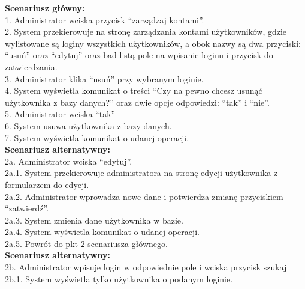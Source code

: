 \textbf{Scenariusz główny:}\\
1. Administrator wciska przycisk “zarządzaj kontami”.\\
2. System przekierowuje na stronę zarządzania kontami użytkowników, gdzie
wylistowane są loginy wszystkich użytkowników, a obok nazwy są dwa przyciski:
“usuń” oraz “edytuj” oraz bad listą pole na wpisanie loginu i przycisk do
zatwierdzania.\\
3. Administrator klika “usuń” przy wybranym loginie.\\
4. System wyświetla komunikat o treści “Czy na pewno chcesz usunąć użytkownika z
bazy danych?” oraz dwie opcje odpowiedzi: “tak” i “nie”.\\
5. Administrator wciska “tak”\\
6. System usuwa użytkownika z bazy danych.\\
7. System wyświetla komunikat o udanej operacji.\\
\textbf{Scenariusz alternatywny:}\\
2a. Administrator wciska “edytuj”.\\
2a.1. System przekierowuje administratora na stronę edycji użytkownika z formularzem do
edycji.\\
2a.2. Administrator wprowadza nowe dane i potwierdza zmianę przyciskiem “zatwierdź”.\\
2a.3. System zmienia dane użytkownika w bazie.\\
2a.4. System wyświetla komunikat o udanej operacji.\\
2a.5. Powrót do pkt 2 scenariusza głównego.\\
\textbf{Scenariusz alternatywny:}\\
2b. Administrator wpisuje login w odpowiednie pole i wciska przycisk szukaj\\
2b.1. System wyświetla tylko użytkownika o podanym loginie.\\